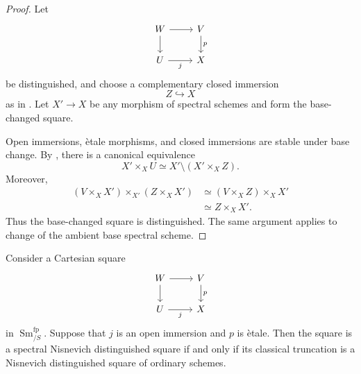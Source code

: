\begin{proof}
Let
\[
\begin{tikzcd}
    W \arrow[r] \arrow[d]
    &
    V \arrow[d, "p"]
    \\
    U \arrow[r, "j"']
    &
    X
\end{tikzcd}
\]
be distinguished, and choose a complementary closed immersion
\[
    Z\hookrightarrow X
\]
as in . Let $X'\to X$ be any morphism
of spectral schemes and form the base-changed square.

Open immersions, \`etale morphisms, and closed immersions are stable under
base change. By , there is a canonical
equivalence
\[
    X'\times_XU
    \simeq
    X'
    \setminus
    (X'\times_XZ).
\]
Moreover,
\[
\begin{aligned}
    (V\times_XX')
    \times_{X'}
    (Z\times_XX')
    &\simeq
    (V\times_XZ)\times_XX'
    \\
    &\simeq
    Z\times_XX'.
\end{aligned}
\]
Thus the base-changed square is distinguished. The same argument applies
to change of the ambient base spectral scheme.
\end{proof}

\begin{proposition}
\label{prop:nisnevich-classical-detection}
Consider a Cartesian square
\[
\begin{tikzcd}
    W \arrow[r] \arrow[d]
    &
    V \arrow[d, "p"]
    \\
    U \arrow[r, "j"']
    &
    X
\end{tikzcd}
\]
in $\operatorname{Sm}^{\mathrm{fp}}_{/S}$. Suppose that $j$ is an open
immersion and $p$ is \`etale. Then the square is a spectral Nisnevich
distinguished square if and only if its classical truncation is a
Nisnevich distinguished square of ordinary schemes.
\end{proposition}

